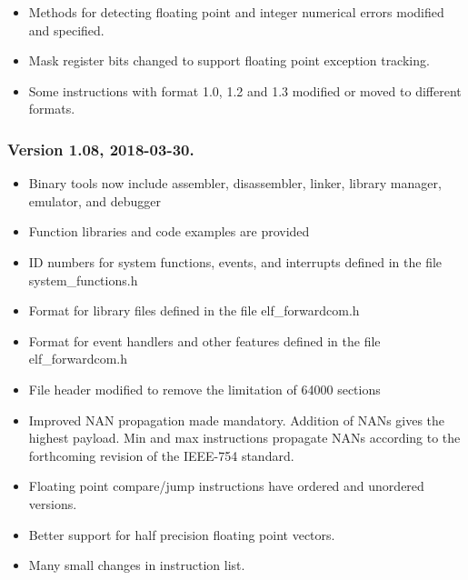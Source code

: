 \documentclass[forwardcom.tex]{subfiles}
\begin{document}
\begin{itemize}
\item Methods for detecting floating point and integer numerical errors modified and specified.
\item Mask register bits changed to support floating point exception tracking.
\item Some instructions with format 1.0, 1.2 and 1.3 modified or moved to different formats.
\end{itemize}


\subsubsection{Version 1.08, 2018-03-30.}
\begin{itemize}

\item Binary tools now include assembler, disassembler, linker, library manager, emulator, and debugger
\item Function libraries and code examples are provided
\item ID numbers for system functions, events, and interrupts defined in the file system\_functions.h
\item Format for library files defined in the file elf\_forwardcom.h
\item Format for event handlers and other features defined in the file elf\_forwardcom.h
\item File header modified to remove the limitation of 64000 sections
\item Improved NAN propagation made mandatory. Addition of NANs gives the highest payload. 
Min and max instructions propagate NANs according to the forthcoming revision of the IEEE-754 standard.
\item Floating point compare/jump instructions have ordered and unordered versions.
\item Better support for half precision floating point vectors.
\item Many small changes in instruction list. 
\end{itemize}
\end{document}
